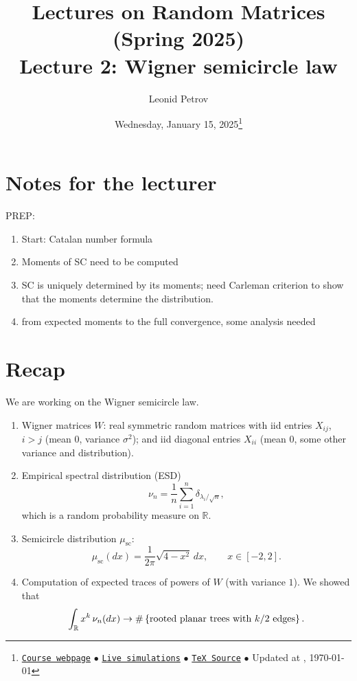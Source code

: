 \documentclass[letterpaper,11pt,oneside,reqno]{article}
\numberwithin{equation}{section}
\theoremstyle{definition}
\newenvironment{lnotes}{\section*{Notes for the lecturer}}{}
\begin{document}
\title{Lectures on Random Matrices
(Spring 2025) \\Lecture 2: Wigner semicircle law}


\date{Wednesday, January 15, 2025\footnote{\href{https://lpetrov.cc/rmt25/}{\texttt{Course webpage}}
$\bullet$ \href{https://lpetrov.cc/simulations/model/random-matrices/}{\texttt{Live simulations}}
$\bullet$ \href{https://lpetrov.cc/rmt25/rmt25-notes/rmt2025-l02.tex}{\texttt{TeX Source}}
$\bullet$
Updated at \currenttime, \today}}



\author{Leonid Petrov}


\maketitle

\tableofcontents



\begin{lnotes}
	PREP:
	\begin{enumerate}
		\item Start:
			Catalan number formula
		\item Moments of SC need to be computed
		\item
			SC is uniquely determined by its moments; need Carleman criterion to show that the moments determine the distribution.
		\item from expected moments to the full convergence, some analysis needed
	\end{enumerate}
\end{lnotes}


\section{Recap}

We are working on the Wigner semicircle law.
\begin{enumerate}
	\item Wigner matrices $W$:
		real symmetric random matrices with iid entries
		$X_{ij}$, $i>j$ (mean 0, variance $\sigma^2$);
		and iid diagonal entries $X_{ii}$ (mean 0, some other variance and distribution).
	\item Empirical spectral distribution (ESD)
		\begin{equation*}
			\nu_n = \frac{1}{n} \sum_{i=1}^{n} \delta_{\lambda_i/\sqrt{n}},
		\end{equation*}
		which is a random probability measure on $\mathbb{R}$.
	\item Semicircle distribution $\mu_{\mathrm{sc}}$:
		\begin{equation*}
			\mu_{\mathrm{sc}}(dx) = \frac{1}{2\pi} \sqrt{4-x^2} \, dx,
			\qquad x \in [-2,2].
		\end{equation*}
	\item Computation of expected traces of powers of $W$
		(with variance $1$). We
		showed that
		\begin{equation*}
		\int_{\mathbb{R}} x^k \, \nu_n(dx) \to
			\#\left\{ \textnormal{rooted planar trees with $k/2$ edges} \right\}.
		\end{equation*}
\end{enumerate}
\end{document}

